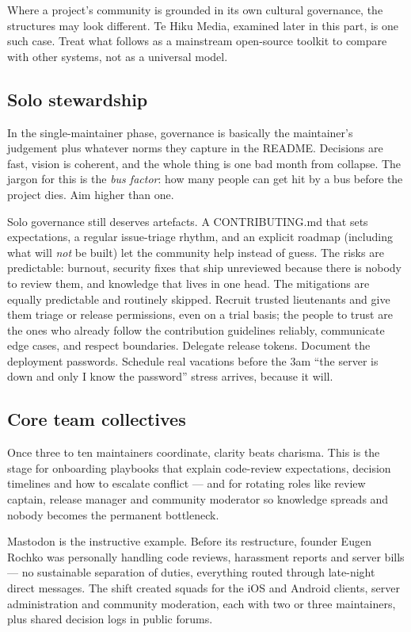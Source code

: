 Where a project's community is grounded in its own cultural governance, the structures may look different. Te Hiku Media, examined later in this part, is one such case. Treat what follows as a mainstream open-source toolkit to compare with other systems, not as a universal model.



\subsection{Solo stewardship}


In the single-maintainer phase, governance is basically the maintainer's judgement plus whatever norms they capture in the README. Decisions are fast, vision is coherent, and the whole thing is one bad month from collapse. The jargon for this is the \emph{bus factor}: how many people can get hit by a bus before the project dies. Aim higher than one.


Solo governance still deserves artefacts. A CONTRIBUTING.md that sets expectations, a regular issue-triage rhythm, and an explicit roadmap (including what will \emph{not} be built) let the community help instead of guess. The risks are predictable: burnout, security fixes that ship unreviewed because there is nobody to review them, and knowledge that lives in one head. The mitigations are equally predictable and routinely skipped. Recruit trusted lieutenants and give them triage or release permissions, even on a trial basis; the people to trust are the ones who already follow the contribution guidelines reliably, communicate edge cases, and respect boundaries. Delegate release tokens. Document the deployment passwords. Schedule real vacations before the 3am ``the server is down and only I know the password'' stress arrives, because it will.



\subsection{Core team collectives}


Once three to ten maintainers coordinate, clarity beats charisma. This is the stage for onboarding playbooks that explain code-review expectations, decision timelines and how to escalate conflict — and for rotating roles like review captain, release manager and community moderator so knowledge spreads and nobody becomes the permanent bottleneck.


Mastodon is the instructive example. Before its restructure, founder Eugen Rochko was personally handling code reviews, harassment reports and server bills — no sustainable separation of duties, everything routed through late-night direct messages. The shift created squads for the iOS and Android clients, server administration and community moderation, each with two or three maintainers, plus shared decision logs in public forums.


